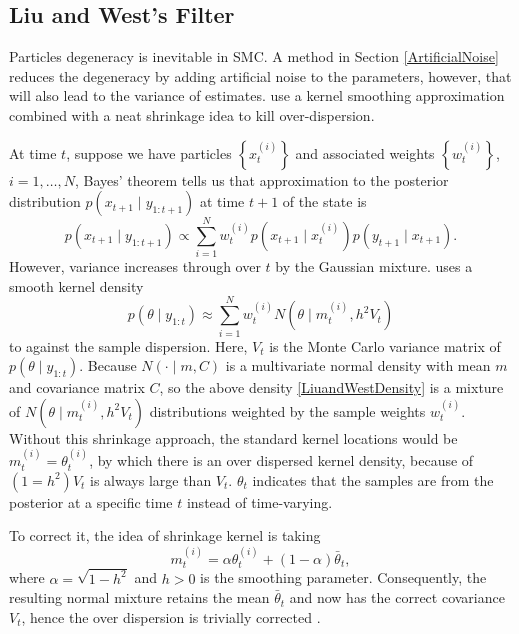 


\subsection{Liu and West's Filter}

Particles degeneracy is inevitable in SMC. A method in Section \ref{ArtificialNoise} reduces the degeneracy by adding artificial noise to the parameters, however, that will also lead to the variance of estimates. \cite{liu2001combined} use a kernel smoothing approximation combined with a neat shrinkage idea to kill over-dispersion. 

At time $t$, suppose we have particles $\left\lbrace x_t^{(i)}\right\rbrace$ and associated weights $\left\lbrace w_t^{(i)}\right\rbrace$, $i=1,\ldots,N$, Bayes' theorem tells us that approximation to the posterior distribution $p(x_{t+1}\mid y_{1:t+1})$ at time $t+1$ of the state is 
\begin{equation*}
p(x_{t+1} \mid y_{1:t+1}) \propto \sum_{i=1}^{N} w_t^{(i)} p\left(x_{t+1} \mid x_t^{(i)}\right)p\left(y_{t+1}\mid x_{t+1}\right).
\end{equation*}
However, variance increases through over $t$ by the Gaussian mixture. \cite{west1993mixture} uses a smooth kernel density 
\begin{equation}\label{LiuandWestDensity}
p(\theta\mid y_{1:t})\approx \sum_{i=1}^{N}w_t^{(i)} N\left(\theta\mid m_t^{(i)},h^2V_t\right)
\end{equation}
to against the sample dispersion. Here, $V_t$ is the Monte Carlo variance matrix of $p(\theta\mid y_{1:t})$. Because $N(\cdot\mid m,C)$ is a multivariate normal density with mean $m$ and covariance matrix $C$, so the above density \eqref{LiuandWestDensity} is a mixture of $N\left(\theta\mid m_t^{(i)},h^2V_t\right)$ distributions weighted by the sample weights $w_t^{(i)}$. Without this shrinkage approach, the standard kernel locations would be $m_t^{(i)}=\theta_t^{(i)}$, by which there is an over dispersed kernel density, because of $(1=h^2)V_t$ is always large than $V_t$. $\theta_t$ indicates that the samples are from the posterior at a specific time $t$ instead of time-varying. 

To correct it, the idea of shrinkage kernel is taking 
\begin{equation}
m_t^{(i)}=\alpha \theta_t^{(i)} + (1-\alpha)\bar{\theta}_t,
\end{equation}
where $\alpha=\sqrt{1-h^2}$ and $h>0$ is the smoothing parameter.
Consequently, the resulting normal mixture retains the mean $\bar{\theta}_t$ and now has the correct covariance $V_t$, hence the over dispersion is trivially corrected \citep{liu2001combined}. 

